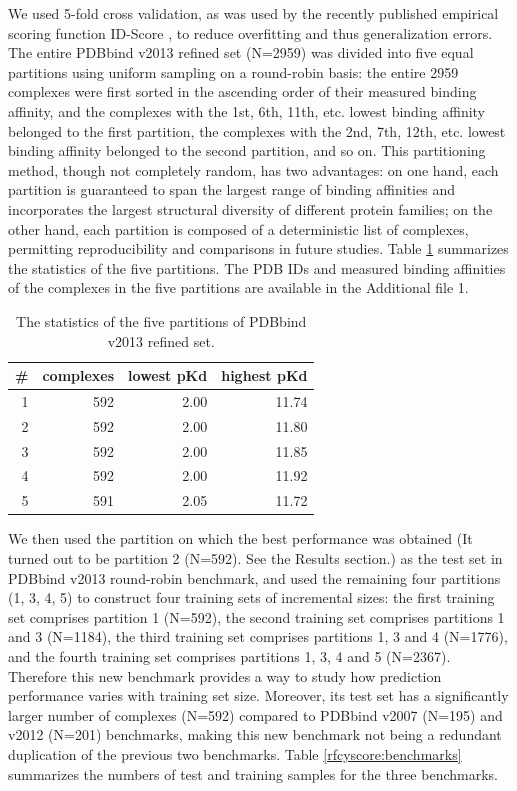 We used 5-fold cross validation, as was used by the recently published empirical scoring function ID-Score \citep{1305}, to reduce overfitting and thus generalization errors. The entire PDBbind v2013 refined set (N=2959) was divided into five equal partitions using uniform sampling on a round-robin basis: the entire 2959 complexes were first sorted in the ascending order of their measured binding affinity, and the complexes with the 1st, 6th, 11th, etc. lowest binding affinity belonged to the first partition, the complexes with the 2nd, 7th, 12th, etc. lowest binding affinity belonged to the second partition, and so on. This partitioning method, though not completely random, has two advantages: on one hand, each partition is guaranteed to span the largest range of binding affinities and incorporates the largest structural diversity of different protein families; on the other hand, each partition is composed of a deterministic list of complexes, permitting reproducibility and comparisons in future studies. Table \ref{rfcyscore:partitions} summarizes the statistics of the five partitions. The PDB IDs and measured binding affinities of the complexes in the five partitions are available in the Additional file 1.

\begin{table}
\caption{The statistics of the five partitions of PDBbind v2013 refined set.}
\label{rfcyscore:partitions}
\begin{tabular}{rrrr}
\hline
\# & complexes & lowest pKd & highest pKd\\
\hline
1 & 592 & 2.00 & 11.74\\
2 & 592 & 2.00 & 11.80\\
3 & 592 & 2.00 & 11.85\\
4 & 592 & 2.00 & 11.92\\
5 & 591 & 2.05 & 11.72\\
\hline
\end{tabular}
\end{table}

We then used the partition on which the best performance was obtained (It turned out to be partition 2 (N=592). See the Results section.) as the test set in PDBbind v2013 round-robin benchmark, and used the remaining four partitions (1, 3, 4, 5) to construct four training sets of incremental sizes: the first training set comprises partition 1 (N=592), the second training set comprises partitions 1 and 3 (N=1184), the third training set comprises partitions 1, 3 and 4 (N=1776), and the fourth training set comprises partitions 1, 3, 4 and 5 (N=2367). Therefore this new benchmark provides a way to study how prediction performance varies with training set size. Moreover, its test set has a significantly larger number of complexes (N=592) compared to PDBbind v2007 (N=195) and v2012 (N=201) benchmarks, making this new benchmark not being a redundant duplication of the previous two benchmarks. Table \ref{rfcyscore:benchmarks} summarizes the numbers of test and training samples for the three benchmarks.


